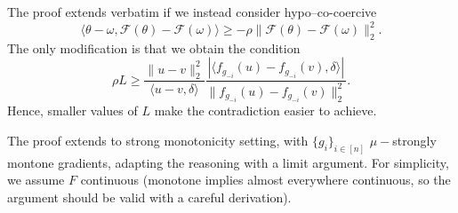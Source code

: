 \documentclass[twoside,11pt]{article}
\newcommand{\F}{\mathcal{F}}
\begin{document}
\begin{remark}
    The proof extends verbatim if we instead consider hypo–co-coercive
    \begin{equation}\label{eq:hypococo}
        \langle \theta - \omega, \F(\theta) - \F(\omega) \rangle \geq -\rho \| \F(\theta) - \F(\omega) \|_2^2.
    \end{equation}
    The only modification is that we obtain the condition
    \[
        \rho L \geq \frac{\|u - v\|_2^2}{\langle u-v, \delta \rangle} \frac{|\langle f_{g_{-i}}(u) - f_{g_{-i}}(v), \delta \rangle |}{\|f_{g_{-i}}(u) - f_{g_{-i}}(v)\|_2^2}.
    \]
    Hence, smaller values of $L$ make the contradiction easier to achieve.
\end{remark}





The proof extends to strong monotonicity setting, with $\{g_i\}_{i\in[n]}$ $\mu-$strongly montone gradients, adapting the reasoning with a limit argument.
For simplicity, we assume $F$ continuous (monotone implies almost everywhere continuous, so the argument should be valid with a careful derivation).
\end{document}
